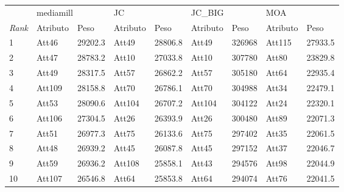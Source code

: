\begin{tabular}{lllllllll}
	\toprule
	{}            & \multicolumn{2}{l}{mediamill} & \multicolumn{2}{l}{JC} & \multicolumn{2}{l}{JC\_BIG} & \multicolumn{2}{l}{MOA}                                          \\
	\textit{Rank} & Atributo                      & Peso                   & Atributo                    & Peso                    & Atributo & Peso   & Atributo & Peso    \\
	\midrule
	1             & Att46                         & 29202.3                & Att49                       & 28806.8                 & Att49    & 326968 & Att115   & 27933.5 \\
	2             & Att47                         & 28783.2                & Att10                       & 27033.8                 & Att10    & 307780 & Att80    & 23829.8 \\
	3             & Att49                         & 28317.5                & Att57                       & 26862.2                 & Att57    & 305180 & Att64    & 22935.4 \\
	4             & Att109                        & 28158.8                & Att70                       & 26786.1                 & Att70    & 304988 & Att34    & 22479.1 \\
	5             & Att53                         & 28090.6                & Att104                      & 26707.2                 & Att104   & 304122 & Att24    & 22320.1 \\
	6             & Att106                        & 27304.5                & Att26                       & 26393.9                 & Att26    & 300480 & Att89    & 22071.3 \\
	7             & Att51                         & 26977.3                & Att75                       & 26133.6                 & Att75    & 297402 & Att35    & 22061.5 \\
	8             & Att48                         & 26939.2                & Att45                       & 26087.8                 & Att45    & 297152 & Att37    & 22046.7 \\
	9             & Att59                         & 26936.2                & Att108                      & 25858.1                 & Att43    & 294576 & Att98    & 22044.9 \\
	10            & Att107                        & 26546.8                & Att64                       & 25853.8                 & Att64    & 294074 & Att76    & 22041.5 \\
	\bottomrule
\end{tabular}

